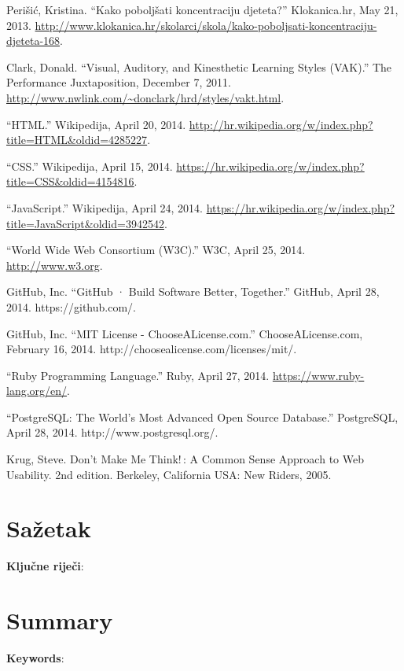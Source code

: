 \documentclass{scrreprt}
\begin{document}
\begin{thebibliography}{99}

  \raggedright

   Perišić, Kristina. “Kako poboljšati koncentraciju djeteta?”
    Klokanica.hr, May 21, 2013.
    \url{http://www.klokanica.hr/skolarci/skola/kako-poboljsati-koncentraciju-djeteta-168}.

   Clark, Donald. “Visual, Auditory, and Kinesthetic Learning
    Styles (VAK).” The Performance Juxtaposition, December 7, 2011.
    \url{http://www.nwlink.com/~donclark/hrd/styles/vakt.html}.

   “HTML.” Wikipedija, April 20, 2014.
    \url{http://hr.wikipedia.org/w/index.php?title=HTML&oldid=4285227}.

   “CSS.” Wikipedija, April 15, 2014.
    \url{https://hr.wikipedia.org/w/index.php?title=CSS&oldid=4154816}.

   “JavaScript.” Wikipedija, April 24, 2014.
    \url{https://hr.wikipedia.org/w/index.php?title=JavaScript&oldid=3942542}.

   “World Wide Web Consortium (W3C).” W3C, April 25, 2014.
    \url{http://www.w3.org}.

   GitHub, Inc. “GitHub · Build Software Better, Together.”
    GitHub, April 28, 2014. https://github.com/.

   GitHub, Inc. “MIT License - ChooseALicense.com.”
    ChooseALicense.com, February 16, 2014.
    http://choosealicense.com/licenses/mit/.

   “Ruby Programming Language.” Ruby, April 27, 2014.
    \url{https://www.ruby-lang.org/en/}.

   “PostgreSQL: The World’s Most Advanced Open Source
    Database.” PostgreSQL, April 28, 2014. http://www.postgresql.org/.

   Krug, Steve. Don’t Make Me Think! : A Common Sense Approach
    to Web Usability. 2nd edition. Berkeley, California USA: New Riders, 2005.

\end{thebibliography}

\chapter{Sažetak}

\textbf{Ključne riječi}:

\chapter{Summary}

\textbf{Keywords}:
\end{document}
